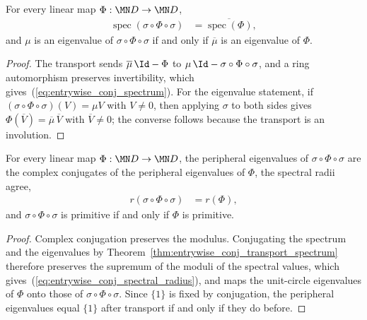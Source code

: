 \begin{theorem}%
    \label{thm:entrywise_conj_transport_spectrum}
    \leanok
    For every linear map $\Phi:\MN D\to\MN D$,
    \begin{align}
        \operatorname{spec}(\sigma\circ\Phi\circ\sigma)
        &=\overline{\operatorname{spec}(\Phi)},
        \label{eq:entrywise_conj_spectrum}
    \end{align}
    and $\mu$ is an eigenvalue of $\sigma\circ\Phi\circ\sigma$ if and only if
    $\overline\mu$ is an eigenvalue of $\Phi$.
\end{theorem}

\begin{proof}\leanok
    The transport sends $\overline\mu\,\Id-\Phi$ to
    $\mu\,\Id-\sigma\circ\Phi\circ\sigma$, and a ring automorphism preserves
    invertibility, which gives~(\ref{eq:entrywise_conj_spectrum}). For the
    eigenvalue statement, if
    $(\sigma\circ\Phi\circ\sigma)(V)=\mu V$ with $V\neq0$, then applying
    $\sigma$ to both sides gives
    $\Phi(\overline V)=\overline\mu\,\overline V$ with $\overline V\neq0$;
    the converse follows because the transport is an involution.
\end{proof}

\begin{theorem}%
    \label{thm:entrywise_conj_transport_peripheral}
    \leanok
    For every linear map $\Phi:\MN D\to\MN D$, the peripheral eigenvalues of
    $\sigma\circ\Phi\circ\sigma$ are the complex conjugates of the peripheral
    eigenvalues of $\Phi$, the spectral radii agree,
    \begin{align}
        r(\sigma\circ\Phi\circ\sigma)&=r(\Phi),
        \label{eq:entrywise_conj_spectral_radius}
    \end{align}
    and $\sigma\circ\Phi\circ\sigma$ is primitive if and only if $\Phi$ is
    primitive.
\end{theorem}

\begin{proof}\leanok
    Complex conjugation preserves the modulus. Conjugating the spectrum and
    the eigenvalues by Theorem~\ref{thm:entrywise_conj_transport_spectrum}
    therefore preserves the supremum of the moduli of the spectral values,
    which gives~(\ref{eq:entrywise_conj_spectral_radius}), and maps the
    unit-circle eigenvalues of $\Phi$ onto those of
    $\sigma\circ\Phi\circ\sigma$. Since $\{1\}$ is fixed by conjugation, the
    peripheral eigenvalues equal $\{1\}$ after transport if and only if they
    do before.
\end{proof}
